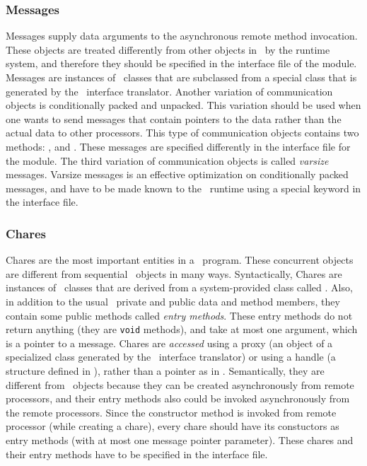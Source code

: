 \subsubsection{Messages}

Messages supply data arguments to the asynchronous remote method invocation.
These objects are treated differently from other objects in \charmpp\ by the
runtime system, and therefore they should be specified in the interface file of
the module.  Messages are instances of \CC\ classes that are subclassed from a
special class that is generated by the \charmpp\ interface translator.  Another
variation of communication objects is conditionally packed and unpacked. This
variation should be used when one wants to send messages that contain pointers
to the data rather than the actual data to other processors. This type of
communication objects contains two methods: , and .
These messages are specified differently in the interface file for the module.
The third variation of communication objects is called {\em varsize} messages.
Varsize messages is an effective optimization on conditionally packed messages,
and have to be made known to the \charmpp\ runtime using a special keyword in
the interface file.

\subsubsection{Chares}

Chares are the most important entities in a \charmpp\ program. These concurrent
objects are different from sequential \CC\ objects in many ways. Syntactically,
Chares are instances of \CC\  classes that are derived from a system-provided
class called . Also, in addition to the usual \CC\ private and
public data and method members, they contain some public methods called {\em
entry methods}. These entry methods do not return anything (they are {\tt void}
methods), and take at most one argument, which is a pointer to a message.
Chares are {\em accessed} using a proxy (an object of a specialized class
generated by the \charmpp\ interface translator) or using a handle (a  structure defined in \charmpp), rather than a pointer as in \CC.
Semantically, they are different from \CC\ objects because they can be created
asynchronously from remote processors, and their entry methods also could be
invoked asynchronously from the remote processors. Since the constructor method
is invoked from remote processor (while creating a chare), every chare should
have its constuctors as entry methods (with at most one message pointer
parameter). These chares and their entry methods have to be specified in the
interface file.

